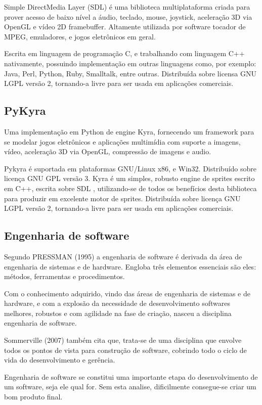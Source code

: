 Simple DirectMedia Layer (SDL) é uma biblioteca multiplataforma criada para prover acesso de baixo nível a áudio, teclado, mouse, joystick, aceleração 3D via OpenGL e vídeo 2D framebuffer. Altamente utilizada por software tocador de MPEG, emuladores, e jogos eletrônicos em geral.

Escrita em linguagem de programação C, e trabalhando com linguagem C++ nativamente, possuindo implementação em outras linguagens como, por exemplo: Java, Perl, Python, Ruby, Smalltalk, entre outras. Distribuída sobre licensa GNU LGPL versão 2, tornando-a livre para ser usada em aplicações comerciais.

\subsection{PyKyra}
	
Uma implementação em Python de engine Kyra, fornecendo um framework para se modelar jogos eletrônicos e aplicações multimídia com suporte a imagens, vídeo, aceleração 3D via OpenGL, compressão de imagens e audio.

Pykyra é suportada em plataformas GNU/Linux x86, e Win32. Distribuído sobre licença GNU GPL versão 3. Kyra é um simples, robusto engine de sprites escrito em C++, escrita sobre SDL , utilizando-se de todos os benefícios desta biblioteca para produzir em excelente motor de sprites. Distribuída sobre licença GNU LGPL versão 2, tornando-a livre para ser usada em aplicações comerciais. 


\subsection{Engenharia de software}

Segundo PRESSMAN (1995) a engenharia de software é derivada da área de engenharia de sistemas e de hardware. Engloba três elementos essenciais são eles: métodos, ferramentas e procedimentos.

Com o conhecimento adquirido, vindo das áreas de engenharia de sistemas e de hardware, e com a explosão da necessidade de desenvolvimento softwares melhores, robustos e com agilidade na fase de criação, nasceu a disciplina engenharia de software.

	Sommerville (2007) também cita que, trata-se de uma disciplina que envolve todos os pontos de vista para construção de software, cobrindo todo o ciclo de vida do desenvolvimento e gerência.
	
	Engenharia de software se constitui uma importante etapa do desenvolvimento de um software, seja ele qual for. Sem esta analise, dificilmente consegue-se criar um bom produto final.	

